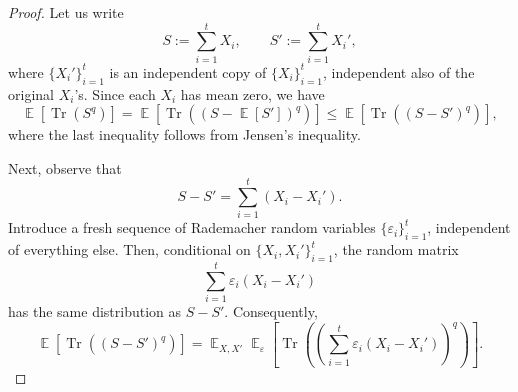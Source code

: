 \documentclass[10pt,a4paper]{article}
\DeclareMathOperator*{\E}{\mathbb{E}}
\DeclareMathOperator*{\Tr}{Tr}
\newcommand{\1}{\mathbbm{1}}
\begin{document}
\begin{proof}
Let us write
\[
   S  :=  \sum_{i=1}^t X_i,\qquad
   S'  :=  \sum_{i=1}^t X_i',
\]
where $\{X_i'\}_{i=1}^t$ is an independent copy of $\{X_i\}_{i=1}^t$, independent also of the original $X_i$’s.  Since each $X_i$ has mean zero, we have
\[
   \E\left[\Tr\left(S^{q}\right)\right]
    = 
   \E\left[\Tr\left(( S - \E[S'] )^{q}\right)\right]
    \le 
   \E\left[\Tr\left(( S - S' )^{q}\right)\right],
\]
where the last inequality follows from Jensen’s inequality.

Next, observe that
\[
   S - S'  =  \sum_{i=1}^t \left(X_i - X_i'\right).
\]
Introduce a fresh sequence of Rademacher random variables $\{\varepsilon_i\}_{i=1}^t$, independent of everything else.  Then, conditional on $\{X_i,X_i'\}_{i=1}^t$, the random matrix
\[
   \sum_{i=1}^t \varepsilon_i \left(X_i - X_i'\right)
\]
has the same distribution as $ S - S'$.
Consequently,
\[
   \E\left[\Tr\left(( S - S' )^{q}\right)\right]
    = 
   \E_{ X,X'} \E_{ \varepsilon}\left[\Tr\left(\left(\sum_{i=1}^t \varepsilon_i (X_i - X_i')\right)^{q}\right)\right].
\]


\end{proof}
\end{document}
